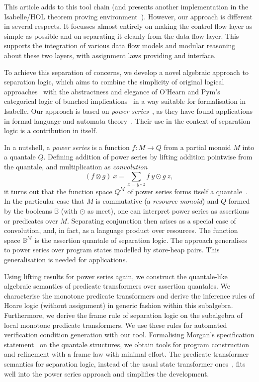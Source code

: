 \documentclass[twoside,runningheads,envcountsame,envcountsect,oribibl,orivec]{llncs}
\begin{document}
This article adds to this tool chain (and presents another
implementation in the Isabelle/HOL theorem proving
environment~\cite{NPW02}).  However, our approach is different in
several respects. It focusses almost entirely on making the control
flow layer as simple as possible and on separating it cleanly from the
data flow layer.  This supports the integration of various data flow
models and modular reasoning about these two layers, with assignment
laws providing and interface.

To achieve this separation of concerns, we develop a novel algebraic
approach to separation logic, which aims to combine the simplicity of
original logical approaches~\cite{OHRY01} with the abstractness and
elegance of O'Hearn and Pym's categorical logic of bunched
implications~\cite{OHearnP99} in a way suitable for formalisation in
Isabelle. Our approach is based on \emph{power series}~\cite{DHS14},
as they have found applications in formal language and automata
theory~\cite{BerstelReutenauer,Handbook}. Their use in the context of
separation logic is  a contribution in itself.

In a nutshell, a \emph{power series} is a function $f:M\to Q$ from a
partial monoid $M$ into a quantale $Q$. Defining addition of power
series by lifting addition pointwise from the quantale, and
multiplication as \emph{convolution}
\begin{equation*}
  (f \otimes g)\ x = \sum_{x=y\circ z} f\ y \odot g\ z,
\end{equation*}
it turns out that the function space $Q^M$ of power series forms
itself a quantale~\cite{DHS14}. In the particular case that $M$ is
commutative (a \emph{resource monoid}) and $Q$ formed by the booleans
$\mathbb{B}$ (with $\odot$ as meet), one can interpret power series
as assertions or predicates over $M$.  Separating conjunction then
arises as a special case of convolution, and, in fact, as a language
product over resources. The function space $\mathbb{B}^M$ is the
assertion quantale of separation logic. The approach generalises to
power series over program states modelled by store-heap pairs. This
generalisation is needed for applications.

Using lifting results for power series again, we construct the
quantale-like algebraic semantics of predicate transformers over
assertion quantales. We characterise the monotone predicate
transformers and derive the inference rules of Hoare logic (without
assignment) in generic fashion within this subalgebra. Furthermore, we
derive the frame rule of separation logic on the subalgebra of local
monotone predicate transformers.  We use these rules for automated
verification condition generation with our tool. Formalising Morgan's
specification statement~\cite{Mor98} on the quantale structures, we
obtain tools for program construction and refinement with a frame law
with minimal effort. The predicate transformer semantics for
separation logic, instead of the usual state transformer
ones~\cite{COY07}, fits well into the power series approach and
simplifies the development.
\end{document}
